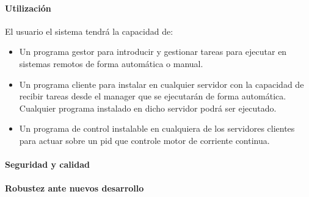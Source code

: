 \paragraph{Utilización}

El usuario el sistema tendrá la capacidad de:

\begin{itemize}
    \item Un programa gestor para introducir y gestionar tareas para ejecutar en sistemas remotos de forma automática o manual.
    \item Un programa cliente para instalar en cualquier servidor con la capacidad de recibir tareas desde el manager que se ejecutarán de forma automática. Cualquier programa instalado en dicho servidor podrá ser ejecutado.
    \item Un programa de control instalable en cualquiera de los servidores clientes para actuar sobre un pid que controle motor de corriente continua.
\end{itemize}

\paragraph{Seguridad y calidad}\label{par:testing}


\paragraph{Robustez ante nuevos desarrollo}






